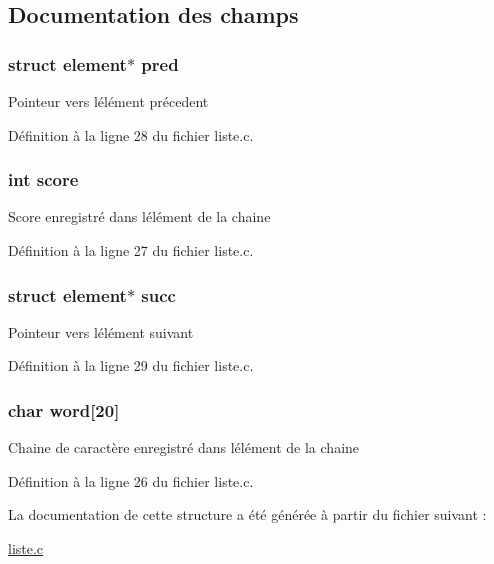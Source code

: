 \subsection{Documentation des champs}
\hypertarget{structelement_a932b74e6abe994b7316f4347a70d215b}{}
\subsubsection[{pred}]{\setlength{\rightskip}{0pt plus 5cm}struct {\bf element}$\ast$ pred}\label{structelement_a932b74e6abe994b7316f4347a70d215b}
Pointeur vers l\textquotesingle{}élément précedent 

Définition à la ligne 28 du fichier liste.\+c.

\hypertarget{structelement_aef160b7437d94056f1dc59646cd5b87d}{}
\subsubsection[{score}]{\setlength{\rightskip}{0pt plus 5cm}int score}\label{structelement_aef160b7437d94056f1dc59646cd5b87d}
Score enregistré dans l\textquotesingle{}élément de la chaine 

Définition à la ligne 27 du fichier liste.\+c.

\hypertarget{structelement_a28a298bdc8522e913d39bf3f672ff5e5}{}
\subsubsection[{succ}]{\setlength{\rightskip}{0pt plus 5cm}struct {\bf element}$\ast$ succ}\label{structelement_a28a298bdc8522e913d39bf3f672ff5e5}
Pointeur vers l\textquotesingle{}élément suivant 

Définition à la ligne 29 du fichier liste.\+c.

\hypertarget{structelement_af034065dfe33f7ef74362e100b14b260}{}
\subsubsection[{word}]{\setlength{\rightskip}{0pt plus 5cm}char word\mbox{[}20\mbox{]}}\label{structelement_af034065dfe33f7ef74362e100b14b260}
Chaine de caractère enregistré dans l\textquotesingle{}élément de la chaine 

Définition à la ligne 26 du fichier liste.\+c.



La documentation de cette structure a été générée à partir du fichier suivant \+:\begin{DoxyCompactItemize}
\item 
\hyperlink{liste_8c}{liste.\+c}\end{DoxyCompactItemize}

